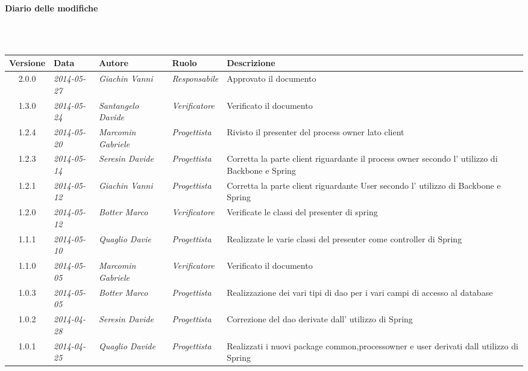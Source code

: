 \noindent\begin{Large}\textbf{Diario delle modifiche}\end{Large}\\
\\
\begin{small}
\begin{tabular}{|c|p{1.8cm}|p{2.8cm}|p{2.8cm}|p{3.5cm}|}
\hline
Versione & Data & Autore & Ruolo & Descrizione \\
\hline
\hline
2.0.0 & \textit{2014-05-27} & 
\textit{Giachin Vanni} &
\textit{Responsabile} & Approvato il documento\\
\hline
\hline
1.3.0 & \textit{2014-05-24} & 
\textit{Santangelo Davide} &
\textit{Verificatore} & Verificato il documento\\
\hline
\hline
1.2.4 & \textit{2014-05-20} & 
\textit{Marcomin Gabriele} &
\textit{Progettista} & Rivisto il presenter del process owner lato client\\
\hline
\hline
1.2.3 & \textit{2014-05-14} & 
\textit{Seresin Davide} &
\textit{Progettista} & Corretta la parte client riguardante il process owner secondo l' utilizzo di Backbone e Spring\\
\hline
\hline
1.2.1 & \textit{2014-05-12} & 
\textit{Giachin Vanni} &
\textit{Progettista} & Corretta la parte client riguardante User secondo l' utilizzo di Backbone e Spring\\
\hline
\hline
1.2.0 & \textit{2014-05-12} & 
\textit{Botter Marco} &
\textit{Verificatore} & Verificate le classi del presenter di spring\\
\hline
\hline
1.1.1 & \textit{2014-05-10} & 
\textit{Quaglio Davie} &
\textit{Progettista} & Realizzate le varie classi del presenter come controller di Spring\\
\hline
\hline
1.1.0 & \textit{2014-05-05} & 
\textit{Marcomin Gabriele} &
\textit{Verificatore} & Verificato il documento\\
\hline
\hline
1.0.3 & \textit{2014-05-05} & 
\textit{Botter Marco} &
\textit{Progettista} & Realizzazione dei vari tipi di dao per i vari campi di accesso al database\\
\hline
\hline
1.0.2 & \textit{2014-04-28} & 
\textit{Seresin Davide} &
\textit{Progettista} & Correzione del dao derivate dall' utilizzo di Spring\\
\hline
\hline
1.0.1 & \textit{2014-04-25} & 
\textit{Quaglio Davide} &
\textit{Progettista} &Realizzati i nuovi package common,processowner e user derivati dall utilizzo di Spring\\

\end{tabular}
\end{small}
